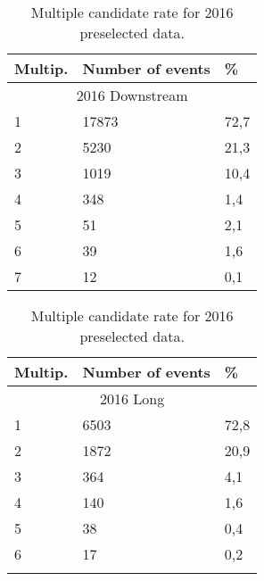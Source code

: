 \begin{table}[h!]
\begin{center}
\begin{tabular}{ p{2.0cm}p{3.6cm}p{0.6cm} }
\hline
\hline
Multip.  & Number of events & \% \\
\hline
    \multicolumn{3}{c}{2016 Downstream}\\
\hline

     1    & 17873	& 72,7 \\
     2    & 5230	& 21,3 \\
     3    & 1019	& 10,4 \\
     4    & 348	& 1,4 \\
     5    & 51	& 2,1 \\
     6    & 39	& 1,6 \\
     7    & 12	& 0,1 \\

\hline
\end{tabular}
\quad
\begin{tabular}{ p{2.0cm}p{3.6cm}p{0.6cm} }
\hline
\hline
Multip.  & Number of events & \% \\
\hline
    \multicolumn{3}{c}{2016 Long}\\
\hline

     1    & 6503	& 72,8 \\
     2    & 1872	& 20,9  \\
     3    & 364	& 4,1  \\
     4    & 140	& 1,6  \\
     5    & 38	& 0,4  \\
     6    & 17	& 0,2  \\
         & 	&   \\

\hline
\end{tabular}
\caption{Multiple candidate rate for 2016 preselected data.}
\label{tab:multi2016sel}
\end{center}
\end{table}%


